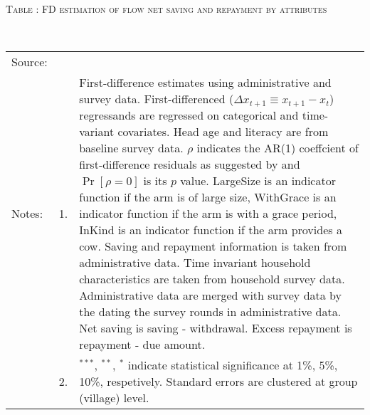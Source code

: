 \hspace{-1cm}\begin{minipage}[t]{14cm}
\hfil\textsc{\normalsize Table \thetable: FD estimation of flow net saving and repayment by attributes\label{tab FD flow saving attributes original HH}}\\
\setlength{\tabcolsep}{1pt}
\setlength{\baselineskip}{8pt}
\renewcommand{\arraystretch}{.55}
\hspace{-.75cm}\\
\renewcommand{\arraystretch}{.8}
\setlength{\tabcolsep}{1pt}
\begin{tabular}{>{\hfill\scriptsize}p{1cm}<{}>{\hfill\scriptsize}p{.25cm}<{}>{\scriptsize}p{12cm}<{\hfill}}
Source:& \multicolumn{2}{l}{\scriptsize Estimated with GUK administrative and survey data.}\\
Notes: & 1. & First-difference estimates using administrative and survey data. First-differenced ($\Delta x_{t+1}\equiv x_{t+1} - x_{t}$) regressands are regressed on categorical and time-variant covariates. Head age and literacy are from baseline survey data. $\rho$ indicates the AR(1) coeffcient of first-difference residuals as suggested by \citet[][10.71]{Wooldridge2010} and $\Pr[\rho=0]$ is its $p$ value. \textsf{LargeSize} is an indicator function if the arm is of large size, \textsf{WithGrace} is an indicator function if the arm is with a grace period, \textsf{InKind} is an indicator function if the arm provides a cow. Saving and repayment information is taken from administrative data. Time invariant household characteristics are taken from household survey data. Administrative data are merged with survey data by the dating the survey rounds in administrative data. Net saving is saving - withdrawal. Excess repayment is repayment - due amount.\\
& 2. & ${}^{***}$, ${}^{**}$, ${}^{*}$ indicate statistical significance at 1\%, 5\%, 10\%, respetively. Standard errors are clustered at group (village) level.
\end{tabular}
\end{minipage}

